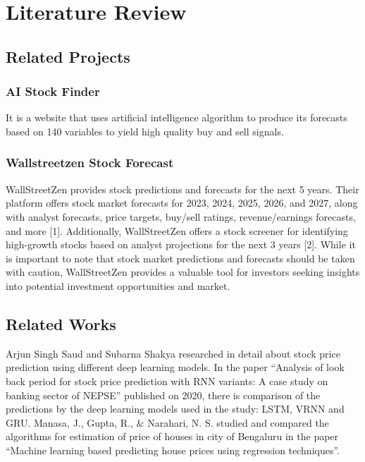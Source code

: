 \chapter{Literature Review}
\vspace{-18pt}
\section{Related Projects}
\vspace{-18pt}
\subsection{AI Stock Finder}
\vspace{-18pt}
It is a website that uses artificial intelligence algorithm to produce its forecasts based on 140 variables to yield high quality buy and sell signals. 
 \vspace{-10pt}
\subsection{Wallstreetzen Stock Forecast}
\vspace{-18pt}
WallStreetZen provides stock predictions and forecasts for the next 5 years. Their platform offers stock market forecasts for 2023, 2024, 2025, 2026, and 2027, along with analyst forecasts, price targets, buy/sell ratings, revenue/earnings forecasts, and more [1]. Additionally, WallStreetZen offers a stock screener for identifying high-growth stocks based on analyst projections for the next 3 years [2]. While it is important to note that stock market predictions and forecasts should be taken with caution, WallStreetZen provides a valuable tool for investors seeking insights into potential investment opportunities and market.
\vspace{-10pt}
\section{Related Works}
\vspace{-18pt}
Arjun Singh Saud and Subarna Shakya researched in detail about stock price prediction using different deep learning models. In the paper “Analysis of look back period for stock price prediction with RNN variants: A case study on banking sector of NEPSE” published on 2020, there is comparison of the predictions by the deep learning models used in the study: LSTM, VRNN and GRU. \cite{kaushal2021house} Manasa, J., Gupta, R., \& Narahari, N. S. studied and compared the algorithms for estimation of price of houses in city of Bengaluru in the paper “Machine learning based predicting house prices using regression techniques”. \cite{manasa2020machine} 
